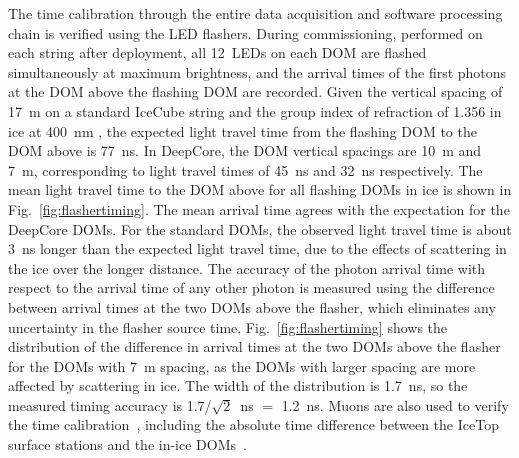 The time calibration through the entire data acquisition and software
processing chain is verified using the LED flashers. During
commissioning, performed on each string after deployment, all 12~LEDs on
each DOM are flashed simultaneously at 
maximum brightness, and the arrival times of the first photons at the DOM above the flashing DOM
are recorded. Given the vertical spacing of 17~m on a standard IceCube
string and the group index of
refraction of  1.356 in ice at 400~nm \cite{price_woschnagg_ice}, the expected light travel time
from the flashing DOM to the DOM above is 77~ns. In DeepCore, the DOM
vertical spacings are 10~m and 7~m, corresponding to light travel
times of 45~ns and 32~ns respectively. The mean light travel
time to the DOM above for all flashing DOMs in ice is shown in
Fig.~\ref{fig:flashertiming}. The mean arrival time agrees with the
expectation for the DeepCore DOMs. For the standard DOMs, the observed
light travel time is about 3~ns longer than the expected light travel
time, due to the effects of scattering in the ice over the longer
distance. The accuracy of the photon arrival time with respect to the
arrival time of any other photon is measured using
the difference between arrival times at the two DOMs above the
flasher, which eliminates any uncertainty in the flasher source
time. Fig.~\ref{fig:flashertiming} shows the distribution of the
difference in arrival times at the two DOMs above the flasher for the
DOMs with 7~m spacing, as the DOMs with larger spacing are more
affected by scattering in ice. The width of the distribution is
1.7~ns, so the measured timing accuracy is 1.7/$\sqrt{2}$~ns $=$ 1.2~ns. Muons are also used to
verify the time calibration~\cite{ICECUBE:DAQ}, including the absolute time difference
between the IceTop surface stations and the in-ice DOMs~\cite{IC3:perf}.

